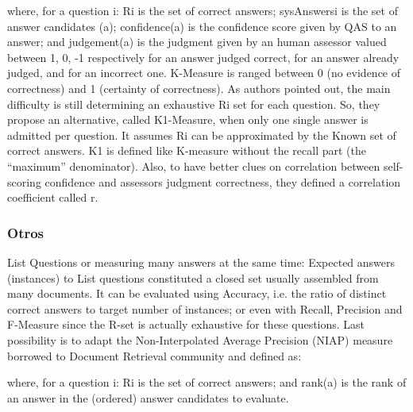 where, for a question i: Ri 
is the set of correct answers; 
sysAnswersi
 is the set of answer candidates (a); confidence(a) 
is the confidence score given by QAS to an answer; and 
judgement(a) is the judgment given by an human assessor 
valued between {1, 0, -1} respectively for an answer judged 
correct, for an answer already judged, and for an incorrect 
one. K-Measure is ranged between 0 (no evidence of 
correctness) and 1 (certainty of correctness). As authors 
pointed out, the main difficulty is still determining an 
exhaustive Ri
 set for each question. So, they propose an 
alternative, called K1-Measure, when only one single answer 
is admitted per question. It assumes Ri
 can be approximated 
by the Known set of correct answers. K1 is defined like 
K-measure without the recall part (the “maximum” 
denominator). Also, to have better clues on correlation 
between self-scoring confidence and assessors judgment 
correctness, they defined a correlation coefficient called r. 

\subsubsection*{Otros}
List Questions or measuring many answers at the same 
time: Expected answers (instances) to List questions 
constituted a closed set usually assembled from many 
documents. It can be evaluated using Accuracy, i.e. the ratio 
of distinct correct answers to target number of instances; or 
even with Recall, Precision and F-Measure since the R-set is 
actually exhaustive for these questions. Last possibility is to 
adapt the Non-Interpolated Average Precision (NIAP) 
measure borrowed to Document Retrieval community and 
defined as: 
 
where, for a question i: Ri 
is the set of correct answers; 
and rank(a) is the rank of an answer in the (ordered) answer 
candidates to evaluate. 


